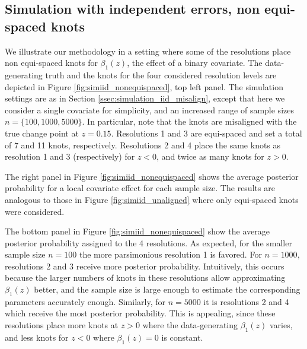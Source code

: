 \subsection{Simulation with independent errors, non equi-spaced knots}
\label{ssec:simulation_iid_nonequispaced}


We illustrate our methodology in a setting where some of the resolutions place non equi-spaced knots for $\beta_1(z)$, the effect of a binary covariate.
The data-generating truth and the knots for the four considered resolution levels are depicted in Figure \ref{fig:simiid_nonequispaced}, top left panel.
The simulation settings are as in Section \ref{ssec:simulation_iid_misalign}, except that here we consider a single covariate for simplicity, and an increased range of sample sizes $n = \{100,1000,5000\}$.
In particular, note that the knots are misaligned with the true change point at $z=0.15$.
Resolutions 1 and 3 are equi-spaced and set a total of 7 and 11 knots, respectively.
Resolutions 2 and 4 place the same knots as resolution 1 and 3 (respectively) for $z<0$, and twice as many knots for $z>0$.

The right panel in Figure \ref{fig:simiid_nonequispaced} shows the average posterior probability for a local covariate effect for each sample size.
The results are analogous to those in Figure \ref{fig:simiid_unaligned} where only equi-spaced knots were considered.

The bottom panel in Figure \ref{fig:simiid_nonequispaced} show the average posterior probability assigned to the 4 resolutions.
As expected, for the smaller sample size $n=100$ the more parsimonious resolution 1 is favored. For $n=1000$, resolutions 2 and 3 receive more posterior probability. Intuitively, this occurs because the larger numbers of knots in these resolutions allow approximating $\beta_1(z)$ better, and the sample size is large enough to estimate the corresponding parameters accurately enough.
Similarly, for $n=5000$ it is resolutions 2 and 4 which receive the most posterior probability. This is appealing, since these resolutions place more knots at $z>0$ where the data-generating $\beta_1(z)$ varies, and less knots for $z<0$ where $\beta_1(z)=0$ is constant.



